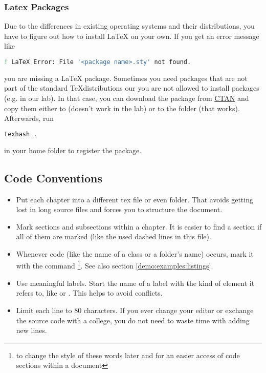 \subsubsection{Latex Packages}
%
Due to the differences in existing operating systems and their distributions,
you have to figure out how to install \LaTeX{} on your own.
%
If you get an error message like
\begin{lstlisting}[language=bash]
! LaTeX Error: File '<package name>.sty' not found.
\end{lstlisting}
you are missing a \LaTeX{} package.
%
Sometimes you need packages that are not part of the standard \TeX distributions
our you are not allowed to install packages (e.g. in our lab).
In that case, you can download the package from
\href{http://www.ctan.org/}{CTAN} and copy them either to
 (doesn't work in the lab)
or to the folder  (that works).
%
Afterwards, run
\begin{lstlisting}[language=bash]
texhash .
\end{lstlisting}
in your home folder to register the package.
%
\subsection{Code Conventions}
%
\begin{itemize}
	\item Put each chapter into a different tex file or even folder.
        That avoids getting lost in long source files and forces
        you to structure the document.
	\item Mark sections and subsections within a chapter.
        It is easier to find a section if all of them are marked
        (like the used dashed lines in this file).
	\item Whenever code (like the name of a class or a folder's name)
		occurs, mark it with the  command
        \footnote{to change the style of these words later and for an easier 
            access of code sections within a document}.
		See also section \ref{demo:examples:listings}.
	\item Use meaningful labels. Start the name of a label with the kind of 
        element it refers to, like 
         or
		. 
        This helps to avoid conflicts.
    \item Limit each line to 80 characters. If you ever change your editor
        or exchange the source code with a college,
        you do not need to waste time with adding new lines.
\end{itemize}
%
